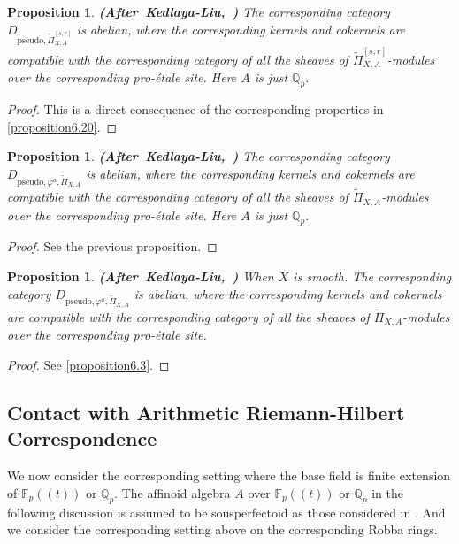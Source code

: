 \documentclass[12pt]{amsart}
\newtheorem{proposition}[theorem]{Proposition}
\theoremstyle{definition}
\numberwithin{equation}{section}
\begin{document}
\begin{proposition} \mbox{\bf{(After Kedlaya-Liu, \cite[Theorem 8.10.2]{KL16})}}
The corresponding category $D_{\mathrm{pseudo},\widetilde{\Pi}^{[s,r]}_{X,A}}$ is abelian, where the corresponding kernels and cokernels are compatible with the corresponding category of all the sheaves of $\widetilde{\Pi}^{[s,r]}_{X,A}$-modules over the corresponding pro-\'etale site. Here $A$ is just $\mathbb{Q}_p$.	
\end{proposition}

\begin{proof}
This is a direct consequence of the corresponding properties in \cref{proposition6.20}.	
\end{proof}


\begin{proposition} \mbox{\bf{(After Kedlaya-Liu, \cite[Theorem 8.10.6]{KL16})}}
The corresponding category $D_{\mathrm{pseudo},\varphi^a,\widetilde{\Pi}_{X,A}}$ is abelian, where the corresponding kernels and cokernels are compatible with the corresponding category of all the sheaves of $\widetilde{\Pi}_{X,A}$-modules over the corresponding pro-\'etale site. Here $A$ is just $\mathbb{Q}_p$.	
\end{proposition}

\begin{proof}
See the previous proposition.	
\end{proof}


\begin{proposition} \mbox{\bf{(After Kedlaya-Liu, \cite[Theorem 8.10.6]{KL16})}}
When $X$ is smooth. The corresponding category $D_{\mathrm{pseudo},\varphi^a,\widetilde{\Pi}_{X,A}}$ is abelian, where the corresponding kernels and cokernels are compatible with the corresponding category of all the sheaves of $\widetilde{\Pi}_{X,A}$-modules over the corresponding pro-\'etale site. 	
\end{proposition}

\begin{proof}
See \cref{proposition6.3}.	
\end{proof}




\subsection{Contact with Arithmetic Riemann-Hilbert Correspondence}


We now consider the corresponding setting where the base field is finite extension of $\mathbb{F}_p((t))$ or $\mathbb{Q}_p$. The affinoid algebra $A$ over $\mathbb{F}_p((t))$ or $\mathbb{Q}_p$ in the following discussion is assumed to be sousperfectoid as those considered in \cite{KH}. And we consider the corresponding setting above on the corresponding Robba rings. \\
\end{document}
